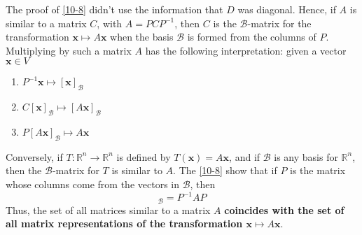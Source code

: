     \begin{Rem}
        The proof of \cref{10-8} didn't use the information that $D$ was diagonal. Hence, if $A$ is similar to a matrix $C$, with $A = PCP^{-1}$, then $C$ is the $\mathcal{B}$-matrix for the transformation $\mathbf{x}\mapsto A\mathbf{x}$ when the basis $\mathcal{B}$ is formed from the columns of $P$. Multiplying by such a matrix $A$  has the following interpretation: given a vector $\mathbf{x}\in V$
        \begin{enumerate}
            \item $P^{-1}\mathbf{x} \mapsto [\mathbf{x}]_{\mathcal{B}}$
            \item $C[\mathbf{x}]_{\mathcal{B}} \mapsto [A\mathbf{x}]_{\mathcal{B}}$
            \item $P[A\mathbf{x}]_{\mathcal{B}}\mapsto A\mathbf{x}$
        \end{enumerate}
        
        
        \begin{center}
        \end{center}

        
        
        Conversely, if $T:\mathbb{R}^n\to \mathbb{R}^n$ is defined by $T(\mathbf{x}) = A\mathbf{x}$, and if $\mathcal{B}$ is any basis for $\mathbb{R}^n$, then the $\mathcal{B}$-matrix for $T$ is similar to $A$. The \cref{10-8} show that if $P$ is the matrix whose columns come from the vectors in $\mathcal{B}$, then
        \begin{equation*}
            [T]_{\mathcal{B}} = P^{-1}AP
        \end{equation*}
        Thus, the set of all matrices similar to a matrix $A$ \textbf{coincides with the set of all matrix representations of the transformation $\mathbf{x}\mapsto A\mathbf{x}$}.
    \end{Rem}

